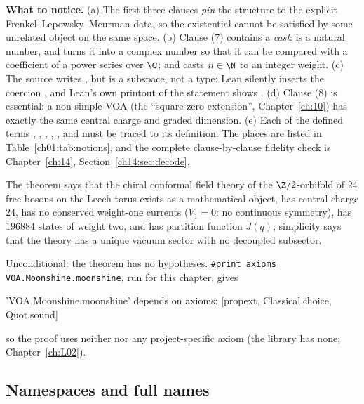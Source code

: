 \begin{dictionary}
\textbf{What to notice.} (a) The first three clauses \emph{pin} the structure to the explicit
Frenkel--Lepowsky--Meurman data, so the existential cannot be satisfied by some unrelated object
on the same space. (b) Clause (7) contains a \emph{cast}:  is a natural
number, and  turns it into a complex number so that it can be compared with a
coefficient of a power series over $\C$; and  casts $n\in\N$ to an integer weight.
(c) The source writes , but  is a subspace,
not a type: Lean silently inserts the coercion , and Lean's own printout of the statement
shows . (d) Clause (8) is essential: a non-simple VOA (the
``square-zero extension'', Chapter~\ref{ch:10}) has exactly the same central charge and graded
dimension. (e) Each of the defined terms , , ,
, ,  and  must be traced to its
definition. The places are listed in Table~\ref{ch01:tab:notions}, and the complete clause-by-clause
fidelity check is Chapter~\ref{ch:14}, Section~\ref{ch14:sec:decode}.
\end{dictionary}

\begin{physics}
The theorem says that the chiral conformal field theory of the $\Z/2$-orbifold of 24 free bosons on
the Leech torus exists as a mathematical object, has central charge $24$, has no conserved weight-one
currents ($V_1 = 0$: no continuous symmetry), has $196884$ states of weight two, and has partition
function $J(q)$; simplicity says that the theory has a unique vacuum sector with no decoupled
subsector.
\end{physics}

\begin{status}
Unconditional: the theorem has no hypotheses. \texttt{\#print axioms VOA.Moonshine.moonshine}, run for
this chapter, gives
\begin{plaincode}
'VOA.Moonshine.moonshine' depends on axioms: [propext, Classical.choice, Quot.sound]
\end{plaincode}
so the proof uses neither  nor any project-specific axiom (the library has none;
Chapter~\ref{ch:L02}).
\end{status}

\subsection{Namespaces and full names}

